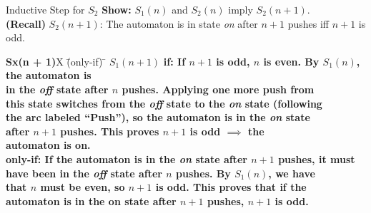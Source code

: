 \begin{wideslide}[bm=,toc=]{Inductive Step for $S_2$}
{\bf Show:} $S_1(n)$ and $S_2(n)$ imply $S_2(n + 1)$.\\
{\bf (Recall)} $S_2(n+1)$: The automaton is in state \emph{on} after $n + 1$
pushes iff $n+1$ is odd.  
\begin{tabbing}
{\bf Sx(n + 1)}X \=  (only-if) \= \kill
{\bf $S_1(n + 1)$}  \>
           \bf{if:} \> 
           If $n + 1$ is odd, $n$ is even. By $S_1(n)$, the automaton is \\
      \>\> in the \emph{off} state after $n$ pushes. Applying one more push from \\
      \>\> this state switches from the \emph{off} state to the \emph{on} state (following \\
      \>\> the arc labeled ``Push''), so the automaton is in the \emph{on} state \\
      \>\> after $n + 1$ pushes. This proves $n + 1$ is odd $\implies$ the \\
      \>\> automaton is on.
           \\[2ex]
      \>
     \bf{only-if:}\> 
           If the automaton is in the \emph{on} state after $n + 1$ pushes, it must \\
      \>\> have been in the \emph{off} state after $n$ pushes. By $S_1(n)$, we have\\
      \>\> that $n$ must be even, so $n+1$ is odd. This proves that if the \\
      \>\> automaton is in the on state after $n + 1$ pushes, $n+1$ is odd. 
           \\[2ex]
\end{tabbing}


\end{wideslide}



